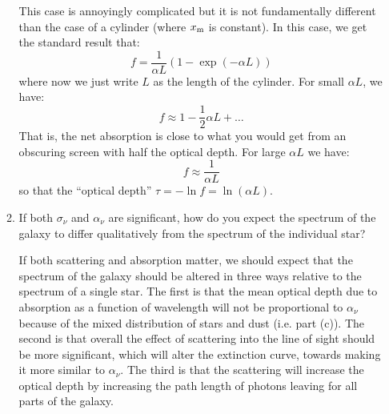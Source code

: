 \documentclass[11pt, preprint]{article}
\begin{document}
\begin{enumerate}
\begin{enumerate}
\begin{answer}
        This case is annoyingly complicated but it is not fundamentally
        different than the case of a cylinder (where $x_{\rm m}$ is
        constant). In this case, we get the standard result that:
        \begin{equation}
          f = \frac{1}{\alpha L} (1 - \exp(-\alpha L))
        \end{equation}
        where now we just write $L$ as the length of the cylinder. For
        small $\alpha L$, we have:
        \begin{equation}
          f \approx 1 - \frac{1}{2}\alpha L + \ldots
        \end{equation}
        That is, the net absorption is close to what you would get
        from an obscuring screen with half the optical depth. For
        large $\alpha L$ we have:
        \begin{equation}
          f \approx \frac{1}{\alpha L}
        \end{equation}
        so that the ``optical depth'' $\tau = - \ln f = \ln(\alpha
        L)$.

      \end{answer}
    \item If both $\sigma_\nu$ and $\alpha_\nu$ are significant, how
      do you expect the spectrum of the galaxy to differ qualitatively
      from the spectrum of the individual star?

      \begin{answer}

        If both scattering and absorption matter, we should expect
        that the spectrum of the galaxy should be altered in three
        ways relative to the spectrum of a single star.  The first is
        that the mean optical depth due to absorption as a function of
        wavelength will not be proportional to $\alpha_\nu$ because of
        the mixed distribution of stars and dust (i.e. part (c)).  The
        second is that overall the effect of scattering into the line
        of sight should be more significant, which will alter the
        extinction curve, towards making it more similar to
        $\alpha_\nu$.  The third is that the scattering will increase
        the optical depth by increasing the path length of photons
        leaving for all parts of the galaxy.
      \end{answer}
  \end{enumerate}
  
\end{enumerate}
\end{document}
